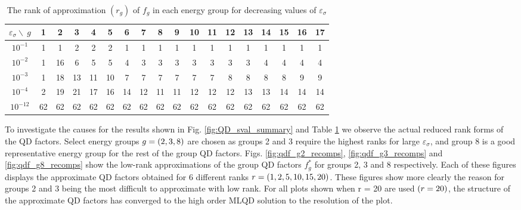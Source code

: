	\begin{table}[ht!]
		\caption{	\label{tab:mqd_sigtab} The rank of approximation $(r_g)$ of $f_g$ in each energy group for decreasing values of $\varepsilon_\sigma$}
		\begin{tabular}{|c||c|c|c|c|c|c|c|c|c|c|c|c|c|c|c|c|c|}	
			\hline
			$\varepsilon_\sigma \backslash  \ g$ & 1 & 2 & 3 & 4 & 5 & 6 & 7 & 8 & 9 & 10 & 11 & 12 & 13 & 14 & 15 & 16 & 17 \\
			\hline
			\hline
			$10^{-1}$ & 1  &  1 & 2  & 2  & 2  & 1  &  1 & 1 &  1 &   1 & 1 &  1 &  1 & 1 &  1 &  1 & 1 \\ \hline
			$10^{-2}$ & 1 & 16 & 6 & 5 & 5 & 4 & 3 & 3 & 3 & 3 & 3 & 3 & 3 & 4 & 4 & 4 & 4\\ \hline
			$10^{-3}$ & 1 & 18 & 13 & 11 & 10 & 7 & 7 & 7 & 7 & 7 & 7 & 8 & 8 & 8 & 8 & 9 & 9\\ \hline
			$10^{-4}$ & 2 & 19 & 21 & 17 & 16 & 14 & 12 & 11 & 11 & 12 & 12 & 12 & 13 & 13 & 14 & 14 & 14\\ \hline
			$10^{-12}$ & 62 & 62 & 62 & 62 & 62 & 62 & 62 & 62 & 62 & 62 & 62 & 62 & 62 & 62 & 62 & 62 & 62\\ \hline
		\end{tabular}
	\end{table}

	
	\ind To investigate the causes for the results shown in Fig. \ref{fig:QD_sval_summary} and Table \ref{tab:mqd_sigtab} we observe the actual reduced rank forms of the QD factors. Select energy groups $g=\left(2,3,8\right)$ are chosen as groups 2 and 3 require the highest ranks for large $\varepsilon_\sigma$, and group 8 is a good representative energy group for the rest of the group QD factors. Figs. \ref{fig:qdf_g2_recomps}, \ref{fig:qdf_g3_recomps} and \ref{fig:qdf_g8_recomps} show the low-rank approximations of the group QD factors $f_g^*$ for groups 2, 3 and 8 respectively. Each of these figures displays the approximate QD factors obtained for 6 different ranks $r=\left(1,2,5,10,15,20\right)$. These figures show more clearly the reason for groups 2 and 3 being the most difficult to approximate with low rank. For all plots shown when r = 20 are used $\left( r=20\right)$, the structure of the approximate QD factors has converged to the high order MLQD solution to the resolution of the plot.
	
